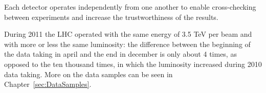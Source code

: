 Each detector operates independently from one another to enable cross-checking between experiments and increase the trustworthiness of the results.

During 2011 the LHC operated with the same energy of 3.5 TeV per beam and with more or less the same luminosity: the difference between the beginning of the data taking in april and the end in december is only about 4 times, as opposed to the ten thousand times, in which the luminosity increased during 2010 data taking. More on the data samples can be seen in Chapter~\ref{sec:DataSamples}.
